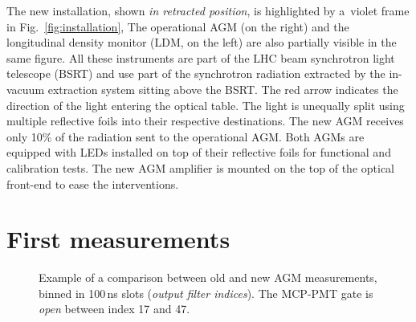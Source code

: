 The new installation, shown \textit{in retracted position}, is  highlighted by a~violet frame in Fig.~\ref{fig:installation}, 
%
The operational AGM  (on the right) and  the longitudinal density monitor (LDM, on the left) are also partially visible in the same figure. 
%
All these instruments are part of the LHC beam synchrotron light telescope (BSRT) and use part of the synchrotron radiation extracted by the in-vacuum extraction system sitting above the BSRT.
%
The red arrow indicates the direction of the light entering the optical table.
%
The light is unequally split using multiple reflective foils into their respective destinations.  The new AGM receives  only 10\% of the radiation sent to the operational AGM.
%
Both AGMs are equipped with LEDs installed  on top of their reflective foils for functional and calibration tests. 
%
%
The new AGM amplifier is mounted on the top of the optical front-end to ease the interventions.

\section{First measurements}

\vspace{-5mm}
\begin{figure}[!htb]
    \begin{center}
        \scalebox{0.54}{}
        \caption{Example of a comparison between old and new  AGM measurements, binned in 100\,ns slots (\emph{output filter indices}).  The MCP-PMT gate is \emph{open} between index 17 and 47.}
        \label{fig:comparison_chart}
    \end{center}
\end{figure}

